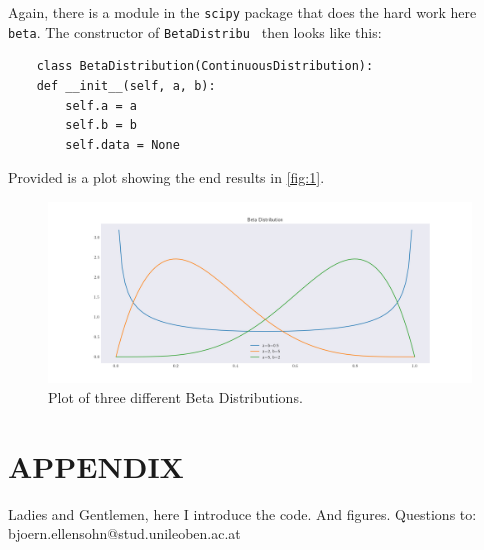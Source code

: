 \documentclass{CPSReport}
\begin{document}
Again, there is a module in the \texttt{scipy} package that does the hard work here \texttt{beta}.
The constructor of \texttt{BetaDistribu
} then looks like this:

\begin{verbatim}
    class BetaDistribution(ContinuousDistribution):
    def __init__(self, a, b):
        self.a = a
        self.b = b
        self.data = None
\end{verbatim}

Provided is a plot showing the end results in \autoref{fig:1}.

\begin{figure}[ht]
    \begin{center}
        \includegraphics[width=1\linewidth]{../beta.png}
    \end{center}
    \caption{Plot of three different Beta Distributions.}
    \label{fig:1}
\end{figure}

\clearpage

\onecolumn
\section*{APPENDIX}\label{sec:appendix}

Ladies and Gentlemen, here I introduce the code. And figures.
\newline Questions to: bjoern.ellensohn@stud.unileoben.ac.at


\end{document}
